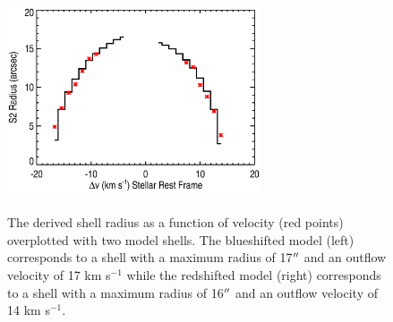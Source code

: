 \documentclass[iop]{emulateapj}
\begin{document}
\begin{figure}
\includegraphics[trim=45pt 0pt 80pt 10pt, width=7.5cm, height=6.5cm]{s2_size.eps}
\caption{The derived shell radius as a function of velocity (red points) overplotted with two model shells. The blueshifted model (left) corresponds to a shell with a maximum radius of 17$\mbox{$^{\prime\prime}$}$ and an outflow velocity of 17 km s${}^{-1}$ while the redshifted model (right) corresponds to a shell with a maximum radius of 16$\mbox{$^{\prime\prime}$}$ and an outflow velocity of 14 km s${}^{-1}$.}
\label{fig:fig5}
\end{figure}
\end{document}
